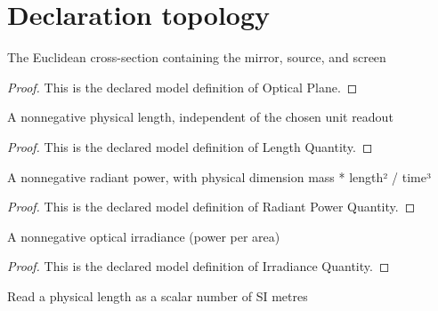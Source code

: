 \section{Declaration topology}
\begin{definition}
  \label{def:physics:phyx-mini-0163:phyxminiproblems-problemphyxmini0163-opticalplane}
  The Euclidean cross-section containing the mirror, source, and screen
\end{definition}
\begin{proof}
  This is the declared model definition of Optical Plane.
\end{proof}
\begin{definition}
  \label{def:physics:phyx-mini-0163:phyxminiproblems-problemphyxmini0163-lengthquantity}
  A nonnegative physical length, independent of the chosen unit readout
\end{definition}
\begin{proof}
  This is the declared model definition of Length Quantity.
\end{proof}
\begin{definition}
  \label{def:physics:phyx-mini-0163:phyxminiproblems-problemphyxmini0163-radiantpowerquantity}
  A nonnegative radiant power, with physical dimension mass * length² / time³
\end{definition}
\begin{proof}
  This is the declared model definition of Radiant Power Quantity.
\end{proof}
\begin{definition}
  \label{def:physics:phyx-mini-0163:phyxminiproblems-problemphyxmini0163-irradiancequantity}
  A nonnegative optical irradiance (power per area)
\end{definition}
\begin{proof}
  This is the declared model definition of Irradiance Quantity.
\end{proof}
\begin{definition}
  \label{def:physics:phyx-mini-0163:phyxminiproblems-problemphyxmini0163-lengthinmetres}
  Read a physical length as a scalar number of SI metres
\end{definition}
